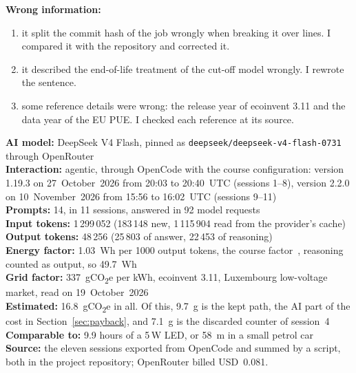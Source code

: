 \documentclass[conference,a4paper]{IEEEtran}
\begin{document}
\textbf{Wrong information:}
\begin{enumerate}
\item it split the commit hash of the job wrongly when breaking it over lines.
  I compared it with the repository and corrected it.
\item it described the end-of-life treatment of the cut-off model wrongly. I
  rewrote the sentence.
\item some reference details were wrong: the release year of ecoinvent 3.11 and
  the data year of the EU PUE. I checked each reference at its source.
\end{enumerate}

\medskip
\noindent\textbf{AI model:} DeepSeek V4 Flash, pinned as
\texttt{deepseek/deepseek-v4-flash-0731} through OpenRouter \\
\textbf{Interaction:} agentic, through OpenCode with the course
configuration: version 1.19.3 on 27~October~2026 from 20:03 to 20:40~UTC
(sessions 1--8), version 2.2.0 on 10~November~2026 from 15:56 to 16:02~UTC
(sessions 9--11) \\
\textbf{Prompts:} 14, in 11 sessions, answered in 92 model requests \\
\textbf{Input tokens:} 1\,299\,052 (183\,148 new, 1\,115\,904 read from the
provider's cache) \\
\textbf{Output tokens:} 48\,256 (25\,803 of answer, 22\,453 of reasoning) \\
\textbf{Energy factor:} 1.03~Wh per 1000 output tokens, the course factor~\cite{ries2026s8,oviedo2026},
reasoning counted as output, so 49.7~Wh \\
\textbf{Grid factor:} 337~gCO\textsubscript{2}e per kWh, ecoinvent 3.11,
Luxembourg low-voltage market, read on 19~October~2026 \\
\textbf{Estimated:} 16.8~gCO\textsubscript{2}e in all. Of this, 9.7~g is the
kept path, the AI part of the cost in Section~\ref{sec:payback}, and 7.1~g is
the discarded counter of session~4 \\
\textbf{Comparable to:} 9.9 hours of a 5\,W LED, or 58~m in a small petrol
car~\cite{ries2026s2} \\
\textbf{Source:} the eleven sessions exported from OpenCode and summed by a
script, both in the project repository; OpenRouter billed USD~0.081.
\end{document}
